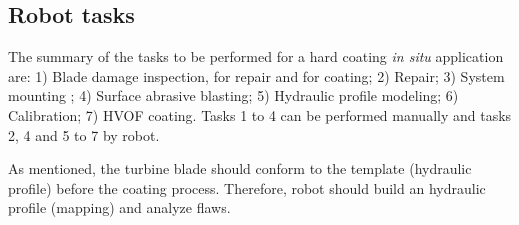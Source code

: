 \subsection{Robot tasks}\label{desc_taref}
The summary of the tasks to be performed for a hard coating \textit{in situ}
application are: 1) Blade damage inspection, for repair and for coating; 2) Repair; 3)
System mounting ; 4) Surface abrasive blasting; 5) Hydraulic profile modeling; 6)
Calibration; 7) HVOF coating.
Tasks 1 to 4 can be performed manually and tasks 2, 4 and 5 to 7 by robot. 





As mentioned, the turbine blade should conform
to the template (hydraulic profile) before the coating process. Therefore,
robot should build an hydraulic profile (mapping) and analyze flaws.

